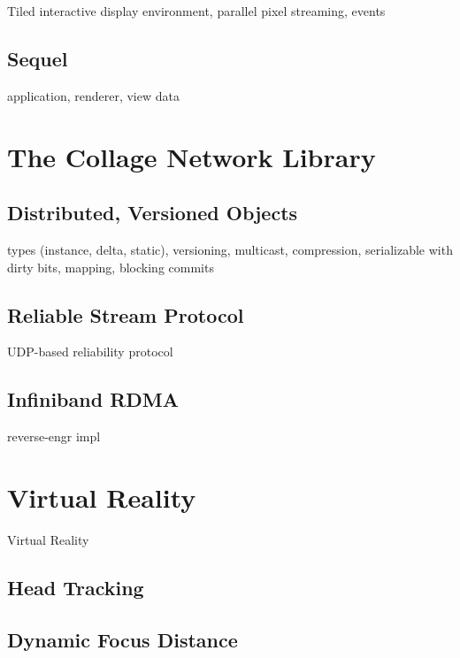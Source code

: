\documentclass[journal]{vgtc}                %
\begin{document}
Tiled interactive display environment, parallel pixel streaming, events

\subsection{Sequel}

application, renderer, view data

\section{The Collage Network Library}

\subsection{Distributed, Versioned Objects}

types (instance, delta, static), versioning, multicast, compression,
serializable with dirty bits, mapping, blocking commits

\subsection{Reliable Stream Protocol}

UDP-based reliability protocol

\subsection{Infiniband RDMA}

reverse-engr impl

\section{Virtual Reality}

Virtual Reality

\subsection{Head Tracking}


\subsection{Dynamic Focus Distance}
\end{document}
